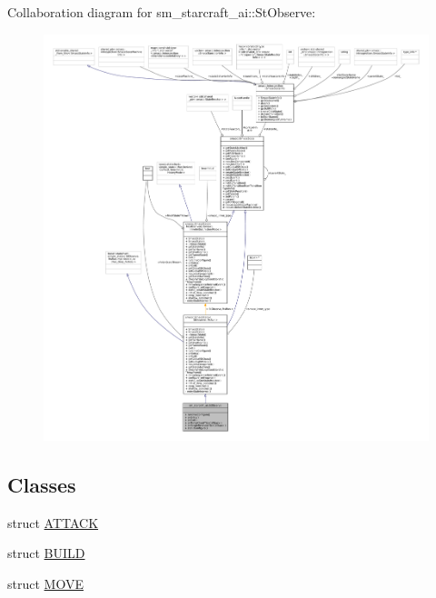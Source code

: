 Collaboration diagram for sm\+\_\+starcraft\+\_\+ai\+:\+:St\+Observe\+:
\nopagebreak
\begin{figure}[H]
\begin{center}
\leavevmode
\includegraphics[width=350pt]{structsm__starcraft__ai_1_1StObserve__coll__graph}
\end{center}
\end{figure}
\subsection*{Classes}
\begin{DoxyCompactItemize}
\item 
struct \hyperlink{structsm__starcraft__ai_1_1StObserve_1_1ATTACK}{A\+T\+T\+A\+CK}
\item 
struct \hyperlink{structsm__starcraft__ai_1_1StObserve_1_1BUILD}{B\+U\+I\+LD}
\item 
struct \hyperlink{structsm__starcraft__ai_1_1StObserve_1_1MOVE}{M\+O\+VE}
\end{DoxyCompactItemize}
